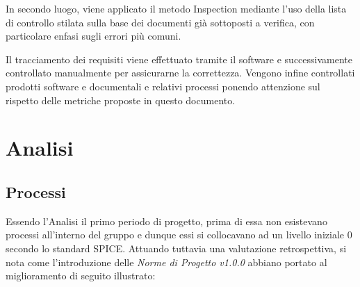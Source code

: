 \documentclass[openany,12pt,a4paper]{report}
\begin{document}
\noindent In secondo luogo, viene applicato il metodo Inspection mediante l'uso della lista di controllo stilata sulla base dei documenti già sottoposti a verifica, con particolare enfasi sugli errori più comuni.

\noindent Il tracciamento dei requisiti viene effettuato tramite il software  e successivamente controllato manualmente per assicurarne la correttezza.
Vengono infine controllati prodotti software e documentali e relativi processi ponendo attenzione sul rispetto delle metriche proposte in questo documento.


\section{Analisi}

\subsection{Processi}

Essendo l'Analisi il primo periodo di progetto, prima di essa non esistevano processi all'interno del gruppo e dunque essi si collocavano ad un livello iniziale 0 secondo lo standard SPICE. Attuando tuttavia una valutazione retrospettiva, si nota come l'introduzione delle \textit{Norme di Progetto v1.0.0} abbiano portato al miglioramento di seguito illustrato:
\end{document}
